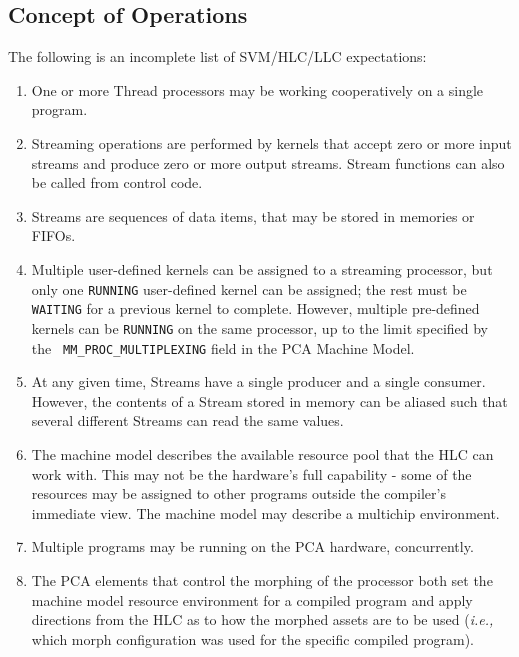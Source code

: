 \subsection{Concept of Operations}
\label{sec:conops}

The following is an incomplete list of SVM/HLC/LLC expectations:

\renewcommand{\labelenumi}{\theenumi.}

\begin{enumerate}

\item One or more Thread processors may be working cooperatively on a
single program.

\item Streaming operations are performed by kernels that accept zero
or more input streams and produce zero or more output streams.  Stream
functions can also be called from control code.

\item Streams are sequences of data items, that may be stored in
memories or FIFOs.

\item Multiple user-defined kernels can be assigned to a streaming
processor, but only one {\tt RUNNING} user-defined kernel can be
assigned; the rest must be {\tt WAITING} for a previous kernel to
complete.  However, multiple pre-defined kernels can be {\tt RUNNING}
on the same processor, up to the limit specified by the {\tt
MM\_PROC\_MULTIPLEXING} field in the PCA Machine Model.

\item At any given time, Streams have a single producer and a single
consumer.  However, the contents of a Stream stored in memory can be
aliased such that several different Streams can read the same values.

\item The machine model describes the available resource pool that the
HLC can work with.  This may not be the hardware's full capability -
some of the resources may be assigned to other programs outside the
compiler's immediate view.  The machine model may describe a multichip
environment.

\item Multiple programs may be running on the PCA hardware,
concurrently.

\item The PCA elements that control the morphing of the processor both
set the machine model resource environment for a compiled program and
apply directions from the HLC as to how the morphed assets are to be
used ({\it i.e.,} which morph configuration was used for the specific
compiled program).


\end{enumerate}
